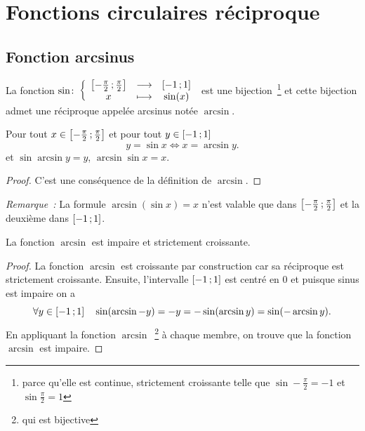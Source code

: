 \section{Fonctions circulaires
réciproque}\label{sec:chap1-fonctionscircréciproques}

\subsection{Fonction arcsinus}\label{subsec:chap1-fonctionarcsinus}

\begin{defdef}
  La fonction
  \(\sin\colon\left\{\begin{array}{ccc}\left[ -\frac{\pi}{2} \, ; {} \frac{\pi}{2} \right] & \longrightarrow &\left[ -1 \, ; {} 1 \right]\\x & \longmapsto & \sin(x)\end{array}\right.\)
  est une bijection~\footnote{parce qu'elle est continue, strictement
  croissante telle que \(\sin -\frac{\pi}{2} = -1\)  et \(\sin \frac{\pi}{2} =
  1\)} et cette bijection admet une réciproque appelée arcsinus notée
  \(\arcsin\).
\end{defdef}

\begin{prop}
  Pour tout \(x \in \left[ -\frac{\pi}{2} \, ; {} \frac{\pi}{2} \right]\) et  pour
  tout \(y \in \left[ -1 \, ; {} 1 \right]\)
  \begin{equation}
    y = \sin x \iff x = \arcsin y.
  \end{equation}
  et \(\sin{\arcsin{y}} = y\), \(\arcsin{\sin{x}} = x\).
\end{prop}

\begin{proof}
  C'est une conséquence de la définition de \(\arcsin\).
\end{proof}

\emph{Remarque~:} La formule \(\arcsin(\sin x) = x\) n'est valable que dans
\(\left[ -\frac{\pi}{2} \, ; {} \frac{\pi}{2} \right]\) et la deuxième dans
\(\left[ -1 \, ; {} 1 \right]\).

\begin{prop}
  La fonction \(\arcsin\) est impaire et strictement croissante.
\end{prop}

\begin{proof}
  La fonction \(\arcsin\) est croissante par construction car sa réciproque est
  strictement croissante. Ensuite, l'intervalle \(\left[ -1 \, ; {} 1 \right]\) est
  centré en 0 et puisque sinus est impaire on a
  \begin{equation}
    \forall y \in \left[ -1 \, ; {} 1 \right] \quad \sin (\arcsin -y) = -y =
    -\sin(\arcsin y) = \sin (-\arcsin y).
  \end{equation}
  En appliquant la fonction \(\arcsin\)~\footnote{qui est bijective} à chaque
  membre, on trouve que la fonction \(\arcsin\) est impaire.
\end{proof}

